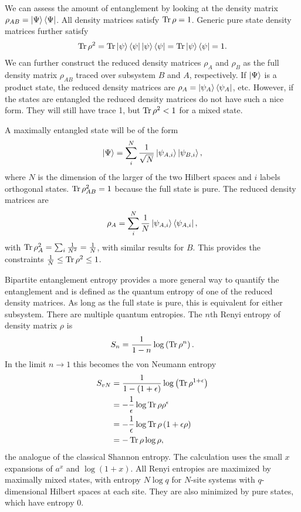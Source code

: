 We can assess the amount of entanglement by looking at the density matrix $\rho_{AB} = \left|\Psi\right\rangle\left\langle\Psi\right|$. All density matrices satisfy $\operatorname{Tr} \rho = 1$. Generic pure state density matrices further satisfy 
\begin{align}
\operatorname{Tr} \rho^2 = \operatorname{Tr}\left|\psi\right\rangle\left\langle\psi\right|\left|\psi\right\rangle\left\langle\psi\right| = \operatorname{Tr}\left|\psi\right\rangle\left\langle\psi\right| = 1.
\end{align}
We can further construct the reduced density matrices $\rho_A$ and $\rho_B$ as the full density matrix $\rho_{AB}$ traced over subsystem $B$ and $A$, respectively. If $\left|\Psi\right\rangle$ is a product state, the reduced density matrices are $\rho_A = \left|\psi_A\right\rangle\left\langle\psi_A\right|$, etc. However, if the states are entangled the reduced density matrices do not have such a nice form. They will still have trace 1, but $\operatorname{Tr}\rho^2<1$ for a mixed state.

A maximally entangled state will be of the form
\begin{align}
\left|\Psi\right\rangle = \sum_i^N\frac{1}{\sqrt{N}}\left|\psi_{A,i}\right\rangle\left|\psi_{B,i}\right\rangle,
\end{align}
where $N$ is the dimension of the larger of the two Hilbert spaces and $i$ labels orthogonal states. $\operatorname{Tr}\rho_{AB}^2=1$ because the full state is pure. The reduced density matrices are
\begin{align}
\rho_A = \sum_i^N\frac{1}{N}\left|\psi_{A,i}\right\rangle\left\langle\psi_{A,i}\right|,
\end{align}
with $\operatorname{Tr}\rho_A^2 = \sum_i\frac{1}{N^2}=\frac{1}{N}$, with similar results for $B$. This provides the constraints $\frac{1}{N}\le\operatorname{Tr}\rho^2\le 1$. 

Bipartite entanglement entropy provides a more general way to quantify the entanglement and is defined as the quantum entropy of one of the reduced density matrices. As long as the full state is pure, this is equivalent for either subsystem. There are multiple quantum entropies. The $n$th Renyi entropy of density matrix $\rho$ is 
\begin{align}
S_n = \frac{1}{1-n}\log\left(\operatorname{Tr}\rho^n\right). \label{eqn:renyi}
\end{align}
In the limit $n\to1$ this becomes the von Neumann entropy 
\begin{align}
S_{vN} &= \frac{1}{1-(1+\epsilon)}\log\left(\operatorname{Tr}\rho^{1+\epsilon}\right) \nonumber\\
&= -\frac{1}{\epsilon}\log \operatorname{Tr} \rho \rho^{\epsilon}\nonumber\\
&= -\frac{1}{\epsilon}\log\operatorname{Tr}\rho\left(1+\epsilon\rho\right) \nonumber\\
&= -\operatorname{Tr}\rho\log\rho,
\end{align}
the analogue of the classical Shannon entropy. The calculation uses the small $x$ expansions of $a^x$ and $\log(1+x)$. All Renyi entropies are maximized by maximally mixed states, with entropy $N\log q$ for $N$-site systems with $q$-dimensional Hilbert spaces at each site. They are also minimized by pure states, which have entropy 0.

